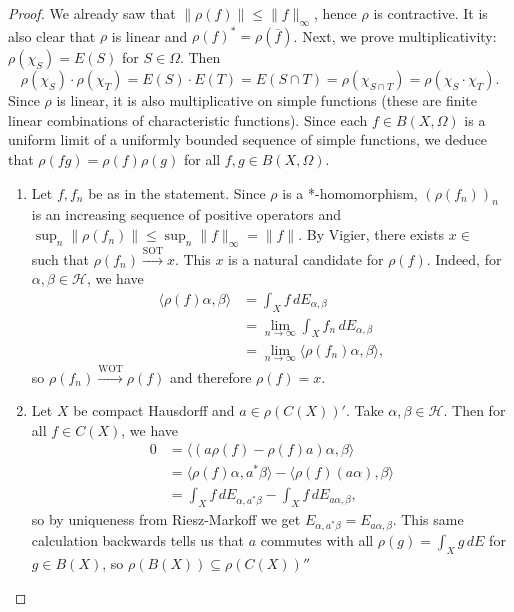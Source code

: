 \documentclass[10pt, a4paper]{article}
\newenvironment{noticeC}{%
  \tcolorbox[%
  notitle,
  empty,
  enhanced,  %
  breakable,
  coltext=black, 
  fontupper=\rmfamily,
  noparskip,
  sharp corners,
  boxrule=-1pt,  %
  frame hidden,
  left=7pt,  %
  right=7pt,
  top=5pt,
  bottom=5pt,
  before skip=2.5ex plus 2pt,
  after skip=2.5ex plus 2pt,
  overlay unbroken and last={%
  },
  ]}
{\endtcolorbox}
\newenvironment{myproof}%
  {\begin{noticeC}\begin{proof}}%
  {\end{proof}\end{noticeC}}
\DeclareMathOperator{\bh}{\mathcal{B} (\mathcal{H})}
\begin{document}
\begin{myproof}
  We already saw that $\|\rho (f)\| \leq \| f\|_{\infty}$, hence $\rho$ is contractive.
  It is also clear that $\rho$ is linear and $\rho (f)^* = \rho (\overline{f})$.
  Next, we prove multiplicativity: $\rho (\chi_S) = E(S)$ for $S \in \Omega$.
  Then $$\rho (\chi_S) \cdot \rho (\chi_T) = E(S) \cdot E(T) = E(S \cap T) = \rho (\chi_{S \cap T}) = \rho (\chi_S \cdot \chi_T).$$
  Since $\rho$ is linear, it is also multiplicative on simple functions (these are finite linear combinations of characteristic functions). 
  Since each $f \in B (X, \Omega)$ is a uniform limit of a uniformly bounded sequence of simple functions,
  we deduce that $\rho (fg) = \rho (f) \rho (g)$ for all $f, g \in B (X, \Omega)$.
  \begin{enumerate}
    \item Let $f, f_n$ be as in the statement. Since $\rho$ is a *-homomorphism,
    $(\rho(f_n))_n$ is an increasing sequence of positive operators and $\sup_n \| \rho (f_n)\| \leq \sup_{n} \|f\|_{\infty} = \|f\|$.
    By Vigier, there exists $x \in \bh$ such that $\rho(f_n) \xrightarrow{\mathrm{SOT}} x$.
    This $x$ is a natural candidate for $\rho(f)$. Indeed, for $\alpha, \beta \in \mathcal{H}$, we have 
    \begin{align*}
      \langle \rho(f) \alpha, \beta\rangle &= \int_X f\, dE_{\alpha, \beta}\\
      &= \lim_{n \to \infty} \int_X f_n\, dE_{\alpha, \beta}\\
      &= \lim_{n \to \infty} \langle \rho(f_n) \alpha, \beta\rangle,
    \end{align*}
    so $\rho(f_n) \xrightarrow{\mathrm{WOT}} \rho(f)$ and therefore $\rho(f) = x$.
    \item Let $X$ be compact Hausdorff and $a \in \rho(C(X))'$. Take $\alpha, \beta \in \mathcal{H}$.
    Then for all $f \in C(X)$, we have 
    \begin{align*}
      0 &= \langle (a \rho(f) - \rho(f) a)\alpha, \beta\rangle\\
      &= \langle \rho(f) \alpha, a^*\beta\rangle - \langle \rho(f) (a\alpha), \beta\rangle\\
      &= \int_X f\, dE_{\alpha, a^* \beta} - \int_X f\, dE_{a\alpha, \beta},
    \end{align*}
    so by uniqueness from Riesz-Markoff we get $E_{\alpha, a^* \beta} = E_{a\alpha,\beta}$.
    This same calculation backwards tells us that $a$ commutes with all $\rho(g) = \int_X g\, dE$ for $g \in B(X)$, so 
    $\rho(B(X)) \subseteq \rho(C(X))''$ \qedhere
  \end{enumerate}
\end{myproof}
\end{document}
